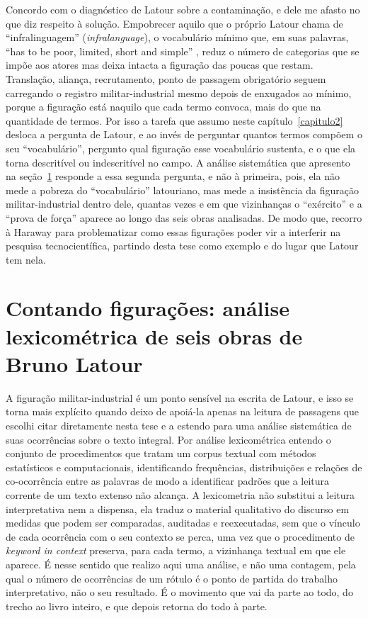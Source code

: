 Concordo com o diagnóstico de Latour sobre a contaminação, e dele me afasto no que diz respeito à solução. Empobrecer aquilo que o próprio Latour chama de \enquote{infralinguagem} (\textit{infralanguage}), o vocabulário mínimo que, em suas palavras, \enquote{has to be poor, limited, short and simple} \parencite[p.~\texttt{[p. 7]}]{latour1996clarifications}, reduz o número de categorias que se impõe aos atores mas deixa intacta a figuração das poucas que restam. Translação, aliança, recrutamento, ponto de passagem obrigatório seguem carregando o registro militar-industrial mesmo depois de enxugados ao mínimo, porque a figuração está naquilo que cada termo convoca, mais do que na quantidade de termos. Por isso a tarefa que assumo neste capítulo~\ref{capitulo2} desloca a pergunta de Latour, e ao invés de perguntar quantos termos compõem o seu \enquote{vocabulário}, pergunto qual figuração esse vocabulário sustenta, e o que ela torna descritível ou indescritível no campo. A análise sistemática que apresento na seção~\ref{sec:analise_lexicometrica} responde a essa segunda pergunta, e não à primeira, pois, ela não mede a pobreza do \enquote{vocabulário} latouriano, mas mede a insistência da figuração militar-industrial dentro dele, quantas vezes e em que vizinhanças o \enquote{exército} e a \enquote{prova de força} aparece ao longo das seis obras analisadas. De modo que, recorro à Haraway para problematizar como essas figurações poder vir a interferir na pesquisa tecnocientífica, partindo desta tese como exemplo e do lugar que Latour tem nela. 

\section{Contando figurações: análise lexicométrica de seis obras de Bruno Latour}
\label{sec:analise_lexicometrica}

A figuração militar-industrial é um ponto sensível na escrita de Latour, e isso se torna mais explícito quando deixo de apoiá-la apenas na leitura de passagens que escolhi citar diretamente nesta tese e a estendo para uma análise sistemática de suas ocorrências sobre o texto integral. Por análise lexicométrica entendo o conjunto de procedimentos que tratam um corpus textual com métodos estatísticos e computacionais, identificando frequências, distribuições e relações de co-ocorrência entre as palavras de modo a identificar padrões que a leitura corrente de um texto extenso não alcança. A lexicometria não substitui a leitura interpretativa nem a dispensa, ela traduz o material qualitativo do discurso em medidas que podem ser comparadas, auditadas e reexecutadas, sem que o vínculo de cada ocorrência com o seu contexto se perca, uma vez que o procedimento de \emph{keyword in context} preserva, para cada termo, a vizinhança textual em que ele aparece. É nesse sentido que realizo aqui uma análise, e não uma contagem, pela qual o número de ocorrências de um rótulo é o ponto de partida do trabalho interpretativo, não o seu resultado. É o movimento que vai da parte ao todo, do trecho ao livro inteiro, e que depois retorna do todo à parte.

